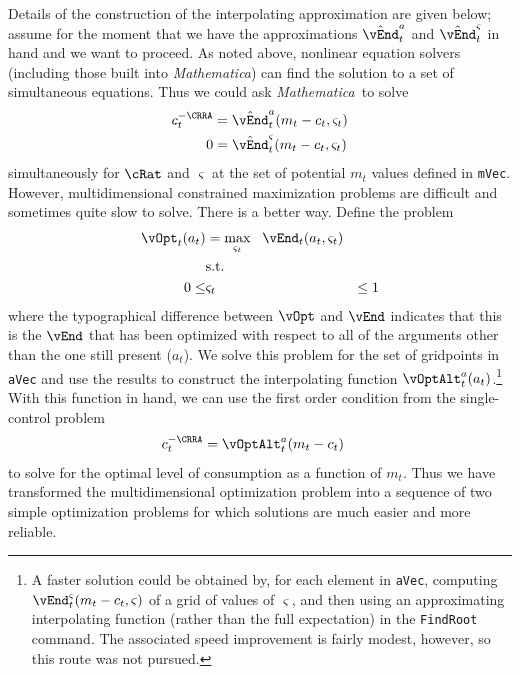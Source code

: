 \documentclass[titlepage]{\econtex}
\newcommand{\Mma}{\textit{Mathematica}}
\begin{document}
Details of the construction of the interpolating approximation are
given below; assume for the moment that we have the approximations
$\hat{\vEnd}_{t}^{{a}}$ and $\hat{\vEnd}_{t}^{\varsigma}$ in
hand and we want to proceed.  As noted above, nonlinear equation
solvers (including those built into {\Mma}) can find the
solution to a set of simultaneous equations.  Thus we could ask
{\Mma}~to solve
\begin{equation}\begin{gathered}\begin{aligned}
  {c}_{t}^{-\CRRA}  & = \hat{\vEnd}^{a}_{t}({m}_{t}-{c}_{t},\varsigma_{t}) \label{eq:FOCwrtcMultContr}
  \\      0  & = \hat{\vEnd}^{\varsigma}_{t}({m}_{t}-{c}_{t},\varsigma_{t}) \label{eq:FOCwrtw}
\end{aligned}\end{gathered}\end{equation}
simultaneously for $\cRat$ and $\varsigma$ at the set of potential ${m}_{t}$ values defined in
\texttt{mVec}. However, multidimensional constrained
maximization problems are difficult and sometimes quite slow to
solve.  There is a better way.  Define the problem
\begin{equation}\begin{gathered}\begin{aligned}
  \vOpt_{t}({a}_{t})  & = \max_{\varsigma_{t}} ~~  \vEnd_{t}({a}_{t},\varsigma_{t})
  \\      & \text{s.t.} & \nonumber
  \\      0 \leq & \varsigma_{t} & \leq 1
\end{aligned}\end{gathered}\end{equation}
where the typographical difference between $\vOpt$ and $\vEnd$
indicates that this is the $\vEnd$ that has been optimized with
respect to all of the arguments other than the one still present
(${a}_{t}$).  We solve this problem for the set of gridpoints in
\texttt{aVec} and use the results to construct the interpolating
function $\vOptAlt_{t}^{a}({a}_{t})$.\footnote{A faster solution
  could be obtained by, for each element in \texttt{aVec}, computing
  $\vEnd^{\varsigma}_{t}({m}_{t}-{c}_{t},\varsigma)$ of a grid of
  values of $\varsigma$, and then using an approximating interpolating
  function (rather than the full expectation) in the \texttt{FindRoot}
  command.  The associated speed improvement is fairly modest,
  however, so this route was not pursued.}  With this function in
hand, we can use the first order condition from the single-control
problem
\begin{equation*}\begin{gathered}\begin{aligned}
  {c}_{t}^{-\CRRA}  & = \vOptAlt_{t}^{{a}}({m}_{t}-{c}_{t})
\end{aligned}\end{gathered}\end{equation*}
to solve for the optimal level of consumption as a function of
${m}_{t}$.  Thus we have transformed the multidimensional optimization
problem into a sequence of two simple optimization problems for which
solutions are much easier and more reliable.
\end{document}
